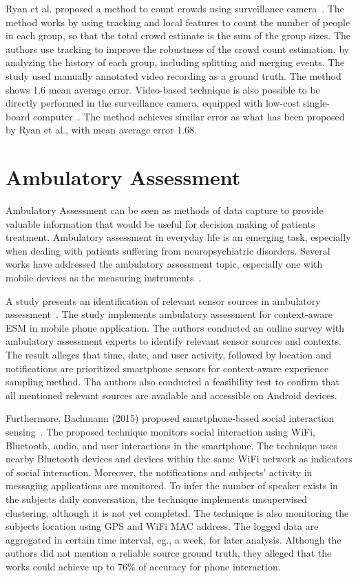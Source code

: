	Ryan et al. proposed a method to count crowds using surveillance camera~\cite{thesis034}. The method works by using tracking and local features to count the number of people in each group, so that the total crowd estimate is the sum of the group sizes. The authors use tracking to improve the robustness of the crowd count estimation, by analyzing the history of each group, including splitting and merging events. The study used manually annotated video recording as a ground truth. The method shows 1.6 mean average error. Video-based technique is also possible to be directly performed in the surveillance camera, equipped with low-cost single-board computer~\cite{thesis055}. The method achieves similar error as what has been proposed by Ryan et al., with mean average error 1.68.


	





\section{Ambulatory Assessment} %
\label{sec:ambulatory_assessment}
Ambulatory Assessment can be seen as methods of data capture to provide valuable information that would be useful for decision making of patients treatment. Ambulatory assessment in everyday life is an emerging task, especially when dealing with patients suffering from neuropsychiatric disorders. Several works have addressed the ambulatory assessment topic, especially one with mobile devices as the measuring instruments~\cite{thesis001,thesis031,thesis030,thesis015}.

A study presents an identification of relevant sensor sources in ambulatory assessment~\cite{thesis001}. The study implements ambulatory assessment for context-aware \ac{ESM} in mobile phone application. The authors conducted an online survey with ambulatory assessment experts to identify relevant sensor sources and contexts. The result alleges that time, date, and user activity, followed by location and notifications are prioritized smartphone sensors for context-aware experience sampling method. Tha authors also conducted a feasibility test to confirm that all mentioned relevant sources are available and accessible on Android devices.

Furthermore, Bachmann (2015) proposed smartphone-based social interaction sensing~\cite{thesis031}. The proposed technique monitors social interaction using WiFi, Bluetooth, audio, and user interactions in the smartphone. The technique uses nearby Bluetooth devices and devices within the same WiFi network as indicators of social interaction. Moreover, the notifications and subjects' activity in messaging applications are monitored. To infer the number of speaker exists in the subjects daily conversation, the technique implements unsupervised clustering, although it is not yet completed. The technique is also monitoring the subjects location using GPS and WiFi \ac{MAC} address. The logged data are aggregated in certain time interval, eg., a week, for later analysis. Although the authors did not mention a reliable source ground truth, they alleged that the works could achieve up to 76\% of accuracy for phone interaction.

